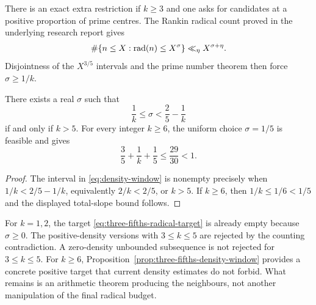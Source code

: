 There is an exact extra restriction if $k\ge3$ and one asks for candidates
at a positive proportion of prime centres.  The Rankin radical count proved in the
underlying research report gives
\[
 \#\{n\le X:\operatorname{rad}(n)\le X^\sigma\}\ll_\eta X^{\sigma+\eta}.
\]
Disjointness of the $X^{3/5}$ intervals and the prime number theorem then
force $\sigma\ge1/k$.

\begin{proposition}
\label{prop:three-fifths-density-window}
There exists a real $\sigma$ such that
\begin{equation}\label{eq:density-window}
 \frac1k\le\sigma<\frac25-\frac1k
\end{equation}
if and only if $k>5$.  For every integer $k\ge6$, the uniform choice
$\sigma=1/5$ is feasible and gives
\[
 \frac35+\frac1k+\frac15\le \frac{29}{30}<1.
\]
\end{proposition}

\begin{proof}
The interval in \eqref{eq:density-window} is nonempty precisely when
$1/k<2/5-1/k$, equivalently $2/k<2/5$, or $k>5$.  If $k\ge6$, then
$1/k\le1/6<1/5$ and the displayed total-slope bound follows.
\end{proof}

For $k=1,2$, the target \eqref{eq:three-fifths-radical-target} is already
empty because $\sigma\ge0$.  The positive-density versions with
$3\le k\le5$ are rejected by the counting contradiction.  A zero-density
unbounded subsequence is not rejected for $3\le k\le5$.  For $k\ge6$,
Proposition~\ref{prop:three-fifths-density-window}
provides a concrete positive target that current density estimates do not
forbid.  What remains is an arithmetic theorem producing the neighbours,
not another manipulation of the final radical budget.
